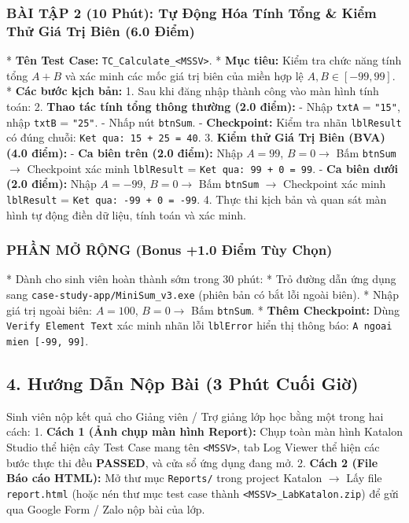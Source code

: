 \subsubsection{BÀI TẬP 2 (10 Phút): Tự Động Hóa Tính Tổng \& Kiểm Thử Giá Trị Biên (6.0 Điểm)}

* \textbf{Tên Test Case:} \texttt{TC_Calculate_<MSSV>}.
* \textbf{Mục tiêu:} Kiểm tra chức năng tính tổng $A + B$ và xác minh các mốc giá trị biên của miền hợp lệ $A, B \in [-99, 99]$.
* \textbf{Các bước kịch bản:}
  1. Sau khi đăng nhập thành công vào màn hình tính toán:
  2. \textbf{Thao tác tính tổng thông thường (2.0 điểm):}
     - Nhập \texttt{txtA} = \texttt{"15"}, nhập \texttt{txtB} = \texttt{"25"}.
     - Nhấp nút \texttt{btnSum}.
     - \textbf{Checkpoint:} Kiểm tra nhãn \texttt{lblResult} có đúng chuỗi: \texttt{Ket qua: 15 + 25 = 40}.
  3. \textbf{Kiểm thử Giá Trị Biên (BVA) (4.0 điểm):}
     - \textbf{Ca biên trên (2.0 điểm):} Nhập $A = 99$, $B = 0 \to$ Bấm \texttt{btnSum} $\to$ Checkpoint xác minh \texttt{lblResult} = \texttt{Ket qua: 99 + 0 = 99}.
     - \textbf{Ca biên dưới (2.0 điểm):} Nhập $A = -99$, $B = 0 \to$ Bấm \texttt{btnSum} $\to$ Checkpoint xác minh \texttt{lblResult} = \texttt{Ket qua: -99 + 0 = -99}.
  4. Thực thi kịch bản và quan sát màn hình tự động điền dữ liệu, tính toán và xác minh.


\subsubsection{PHẦN MỞ RỘNG (Bonus +1.0 Điểm Tùy Chọn)}
* Dành cho sinh viên hoàn thành sớm trong 30 phút:
* Trỏ đường dẫn ứng dụng sang \texttt{case-study-app/MiniSum_v3.exe} (phiên bản có bắt lỗi ngoài biên).
* Nhập giá trị ngoài biên: $A = 100$, $B = 0 \to$ Bấm \texttt{btnSum}.
* \textbf{Thêm Checkpoint:} Dùng \texttt{Verify Element Text} xác minh nhãn lỗi \texttt{lblError} hiển thị thông báo: \texttt{A ngoai mien [-99, 99]}.


\subsection{4. Hướng Dẫn Nộp Bài (3 Phút Cuối Giờ)}

Sinh viên nộp kết quả cho Giảng viên / Trợ giảng lớp học bằng một trong hai cách:
1. \textbf{Cách 1 (Ảnh chụp màn hình Report):} Chụp toàn màn hình Katalon Studio thể hiện cây Test Case mang tên \texttt{<MSSV>}, tab Log Viewer thể hiện các bước thực thi đều \textbf{PASSED}, và cửa sổ ứng dụng đang mở.
2. \textbf{Cách 2 (File Báo cáo HTML):} Mở thư mục \texttt{Reports/} trong project Katalon $\to$ Lấy file \texttt{report.html} (hoặc nén thư mục test case thành \texttt{<MSSV>_LabKatalon.zip}) để gửi qua Google Form / Zalo nộp bài của lớp.


